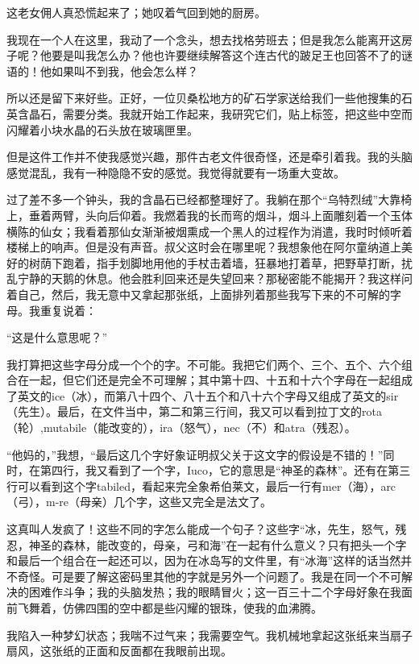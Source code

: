 \documentclass[10pt]{book}
\begin{document}
这老女佣人真恐慌起来了；她叹着气回到她的厨房。

我现在一个人在这里，我动了一个念头，想去找格劳班去；但是我怎么能离开这房子呢？他要是叫我怎么办？他也许要继续解答这个连古代的跛足王也回答不了的谜语的！他如果叫不到我，他会怎么样？

所以还是留下来好些。正好，一位贝桑松地方的矿石学家送给我们一些他搜集的石英含晶石，需要分类。我就开始工作起来，我研究它们，贴上标签，把这些中空而闪耀着小块水晶的石头放在玻璃匣里。

但是这件工作并不使我感觉兴趣，那件古老文件很奇怪，还是牵引着我。我的头脑感觉混乱，我有一种隐隐不安的感觉。我觉得就要有一场重大变故。

过了差不多一个钟头，我的含晶石已经都整理好了。我躺在那个“乌特烈绒”大靠椅上，垂着两臂，头向后仰着。我燃着我的长而弯的烟斗，烟斗上面雕刻着一个玉体横陈的仙女；我看着那仙女渐渐被烟熏成一个黑人的过程作为消遣，我时时倾听着楼梯上的响声。但是没有声音。叔父这时会在哪里呢？我想象他在阿尔童纳道上美好的树荫下跑着，指手划脚地用他的手杖击着墙，狂暴地打着草，把野草打断，扰乱宁静的天鹅的休息。他会胜利回来还是失望回来？那秘密能不能揭开？我这样问着自己，然后，我无意中又拿起那张纸，上面排列着那些我写下来的不可解的字母。我重复说着：

“这是什么意思呢？”

我打算把这些字母分成一个个的字。不可能。我把它们两个、三个、五个、六个组合在一起，但它们还是完全不可理解；其中第十四、十五和十六个字母在一起组成了英文的ice（冰），而第八十四个、八十五个和八十六个字母又组成了英文的sir（先生）。最后，在文件当中，第二和第三行间，我又可以看到拉丁文的rota（轮）,mutabile（能改变的），ira（怒气），nec（不）和atra（残忍）。

“他妈的，”我想，“最后这几个字好象证明叔父关于这文字的假设是不错的！”同时，在第四行，我又看到了一个字，Iuco，它的意思是“神圣的森林”。还有在第三行可以看到这个字tabiled，看起来完全象希伯莱文，最后一行有mer（海），arc（弓），m-re（母亲）几个字，这些又完全是法文了。

这真叫人发疯了！这些不同的字怎么能成一个句子？这些字“冰，先生，怒气，残忍，神圣的森林，能改变的，母亲，弓和海”在一起有什么意义？只有把头一个字和最后一个组合在一起还可以，因为在冰岛写的文件里，有“冰海”这样的话当然并不奇怪。可是要了解这密码里其他的字就是另外一个问题了。我是在同一个不可解决的困难作斗争；我的头脑发热；我的眼睛冒火；这一百三十二个字母好象在我面前飞舞着，仿佛四围的空中都是些闪耀的银珠，使我的血沸腾。

我陷入一种梦幻状态；我喘不过气来；我需要空气。我机械地拿起这张纸来当扇子扇风，这张纸的正面和反面都在我眼前出现。
\end{document}
